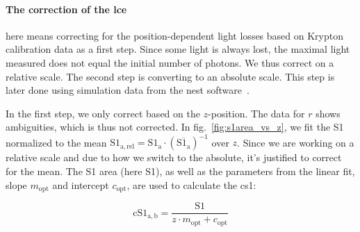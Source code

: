 \paragraph{The correction of the \gls{lce}} here means correcting for the position-dependent light losses based on Krypton calibration data as a first step.
Since some light is always lost, the maximal light measured does not equal the initial number of photons.
We thus correct on a relative scale.
The second step is converting to an absolute scale.
This step is later done using simulation data from the \gls{nest} software~\cite{?}.  %

In the first step, we only correct based on the $ z $-position.
The data for $ r $ shows ambiguities, which is thus not corrected.
In fig.~\ref{fig:s1area_vs_z}, we fit the S1 normalized to the mean $ \mathrm{S1_{a,rel}} = \mathrm{S1_a} \cdot \left( \overline{\mathrm{S1_a}} \right)^{-1} $ over $ z $.  %
Since we are working on a relative scale and due to how we switch to the absolute, it's justified to correct for the mean.
The S1 area (here S1), as well as the parameters from the linear fit, slope $ m_\mathrm{opt} $ and intercept $ c_\mathrm{opt} $, are used to calculate the \gls{cs1}:

\begin{equation}
    \mathrm{cS1}_\mathrm{a,b} = \frac{ \mathrm{S1} }{ z \cdot m_\mathrm{opt} + c_\mathrm{opt} }
\end{equation}










